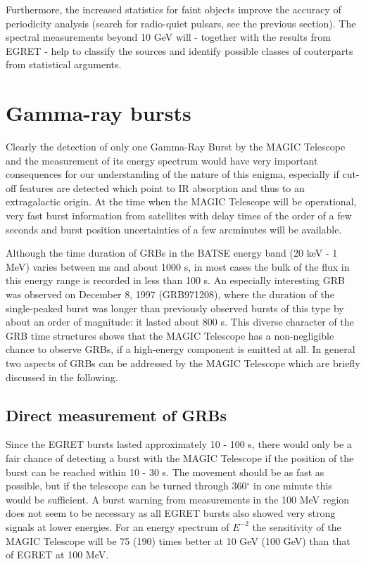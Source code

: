 Furthermore, the increased statistics for faint objects improve the accuracy
of periodicity analysis (search for radio-quiet pulsars, see the previous
section). The spectral measurements beyond 10 GeV will - together with the
results from EGRET - help to classify the sources and identify possible
classes of couterparts from statistical arguments.

\section{Gamma-ray bursts}

\medskip Clearly the detection of only one Gamma-Ray Burst by the MAGIC Telescope and
the measurement of its energy spectrum would have very important
consequences for our understanding of the nature of this enigma, especially
if cut-off features are detected which point to IR absorption and thus to an
extragalactic origin. At the time when the MAGIC Telescope will be
operational, very fast burst information from satellites with delay times of
the order of a few seconds and burst position uncertainties of a few
arcminutes will be available. 

Although the time duration of GRBs in the BATSE energy band (20 keV - 1 MeV)
varies between ms and about 1000 s, in most cases the bulk of the flux in
this energy range is recorded in less than 100 s.
An especially interesting GRB was observed on December 8, 1997 (GRB971208),
where the duration of the single-peaked burst was longer
than previously observed bursts of this type by about an order of magnitude:
it lasted about 800 s. This diverse character of the GRB time structures
shows that the MAGIC Telescope has a non-negligible chance to observe 
GRBs, if a high-energy component is emitted at all.
In general two aspects of GRBs can be addressed by the MAGIC Telescope
which are briefly discussed in the following.

\subsection{Direct measurement of GRBs}

\medskip Since the EGRET bursts lasted approximately 10 - 100 s, there would only be
a fair chance of detecting a burst with the MAGIC Telescope if the position of the burst
can be reached within 10 - 30 s. The movement should be as fast as possible,
but if the telescope can be turned through 360$^\circ$ in one minute this
would be sufficient. A burst warning from measurements in the 100 MeV region
does not seem to be necessary as all EGRET bursts also showed very strong
signals at lower energies. For an energy spectrum of $E^{-2}$ the
sensitivity of the MAGIC Telescope 
will be 75 (190) times better at 10 GeV (100 GeV) than that of
EGRET at 100 MeV.

